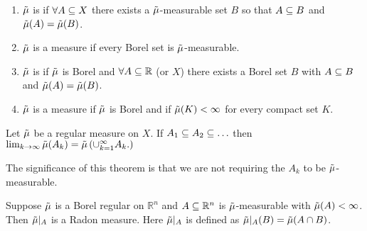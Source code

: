 \begin{defn}\mbox{}
  \begin{enumerate}
    \item $\tilde{\mu}$ is  if $\forall A\subseteq X$ there exists a
      $\tilde{\mu}$-measurable set $B$ so that $A\subseteq B$ and $\tilde{\mu}(A) = \tilde{\mu}(B)$.
    \item $\tilde{\mu}$ is a  measure if every Borel set is
      $\tilde{\mu}$-measurable.
    \item $\tilde{\mu}$ is  if $\tilde{\mu}$ is Borel and
      $\forall A\subseteq \mathbb{R}$ (or $X$) there exists a Borel set
      $B$ with $A\subseteq B$ and $\tilde{\mu}(A)=\tilde{\mu}(B)$.
    \item $\tilde{\mu}$ is a  measure if $\tilde{\mu}$ is Borel and if
      $\tilde{\mu}(K)<\infty$ for every compact set $K$.
  \end{enumerate}
\end{defn}

\begin{thm}
  Let $\tilde{\mu}$ be a regular measure on $X$. If $A_1\subseteq A_2 \subseteq \ldots$
  then $\lim_{k\to \infty}\tilde{\mu}(A_k) = \tilde{\mu}\left( \cup_{k=1}^\infty A_k.
  \right)$
\end{thm}

\begin{remark}
The significance of this theorem is that we are not requiring the $A_k$
to be $\tilde{\mu}$-measurable.
\end{remark}

\begin{thm}
  Suppose $\tilde{\mu}$ is a Borel regular on $\mathbb{R}^n$ and $A\subseteq
  \mathbb{R}^n$ is $\tilde{\mu}$-measurable with $\tilde{\mu}(A)<\infty$. Then
  $\tilde{\mu}\rvert_A$ is a Radon measure. Here $\tilde{\mu}\rvert_A$ is defined as
  $\tilde{\mu}\rvert_A(B)= \tilde{\mu}(A\cap B)$.
\end{thm}

